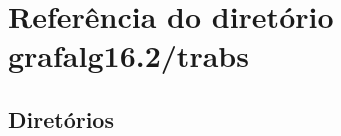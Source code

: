 \section{Referência do diretório grafalg16.2/trabs}
\label{dir_c7858c8456a9c2cba270f3e9cf8f0720}
\subsection*{Diretórios}
\begin{DoxyCompactItemize}
\end{DoxyCompactItemize}
